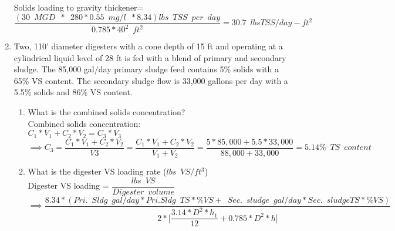\begin{enumerate}
Solids loading to gravity thickener=$\dfrac{(30 \enspace MGD \enspace * \enspace 280*0.55 \enspace mg/l \enspace *8.34) lbs \enspace TSS \enspace per  \enspace day}{0.785*40^2 \enspace ft^2}=\boxed{30.7 \enspace lbs TSS/day-ft^2}$
\pagebreak
\item Two, 110' diameter digesters with a cone depth of 15 ft and operating at a cylindrical liquid level of 28 ft is fed with a blend of primary and secondary sludge.  The 85,000 gal/day primary sludge feed contains 5\% solids with a 65\% VS content.  The secondary sludge flow is 33,000 gallons per day with a 5.5\% solids and 86\% VS content.  

\begin{enumerate}
\item What is the combined solids concentration?\\
Combined solids concentration:\\
$
C_1*V_1 + C_2*V_2 = C_3*V_3$\\
$\implies C_3 = \dfrac{C_1*V_1 + C_2*V_2}{V3}=\dfrac{C_1*V_1 + C_2*V_2}{V_1 + V_2}=\dfrac{5*85,000 + 5.5*33,000}{88,000 + 33,000}=\boxed{5.14\% \enspace TS \enspace content}
$\\

\item What is the digester VS loading rate ($lbs \enspace VS / ft^3$)\\
Digester VS loading = $\dfrac{lbs \enspace VS}{Digester \enspace volume}$\\
\vspace{0.3cm}
$\implies \dfrac{8.34*(Pri. \enspace Sldg \enspace gal/day *Pri. Sldg \enspace TS *\%VS + \enspace Sec. \enspace sludge \enspace gal/day *Sec. \enspace sludge TS *\%VS)}{2*\Big[\dfrac{3.14*D^2*h_1}{12}+0.785*D^2*h\Big]}$
 \vspace{0.4cm}
 
 
 

\end{enumerate}
\end{enumerate}
